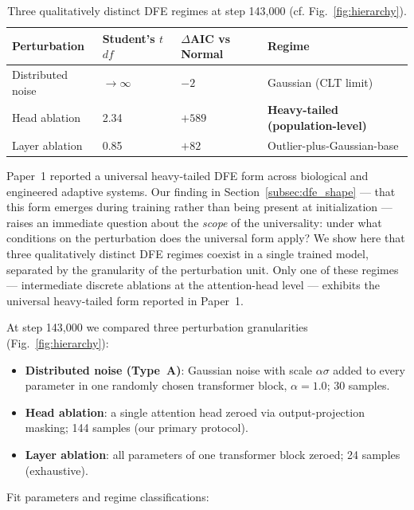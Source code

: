 \documentclass{article}
\begin{document}
\begin{table}[t]
\centering
\caption{Three qualitatively distinct DFE regimes at step 143{,}000 (cf. Fig.~\ref{fig:hierarchy}).}
\label{tab:three_regimes}
\begin{tabular}{llll}
\toprule
Perturbation & Student's $t$ $df$ & $\Delta$AIC vs Normal & Regime \\
\midrule
Distributed noise & $\to \infty$ & $-2$ & Gaussian (CLT limit) \\
Head ablation & 2.34 & $+589$ & \textbf{Heavy-tailed (population-level)} \\
Layer ablation & 0.85 & $+82$ & Outlier-plus-Gaussian-base \\
\bottomrule
\end{tabular}
\end{table}

Paper~1 reported a universal heavy-tailed DFE form across biological and engineered adaptive systems. Our finding in Section~\ref{subsec:dfe_shape} --- that this form emerges during training rather than being present at initialization --- raises an immediate question about the \emph{scope} of the universality: under what conditions on the perturbation does the universal form apply? We show here that three qualitatively distinct DFE regimes coexist in a single trained model, separated by the granularity of the perturbation unit. Only one of these regimes --- intermediate discrete ablations at the attention-head level --- exhibits the universal heavy-tailed form reported in Paper~1.

At step 143,000 we compared three perturbation granularities (Fig.~\ref{fig:hierarchy}):

\begin{itemize}
    \item \textbf{Distributed noise (Type~A)}: Gaussian noise with scale $\alpha\sigma$ added to every parameter in one randomly chosen transformer block, $\alpha = 1.0$; 30 samples.
    \item \textbf{Head ablation}: a single attention head zeroed via output-projection masking; 144 samples (our primary protocol).
    \item \textbf{Layer ablation}: all parameters of one transformer block zeroed; 24 samples (exhaustive).
\end{itemize}

Fit parameters and regime classifications:
\end{document}
